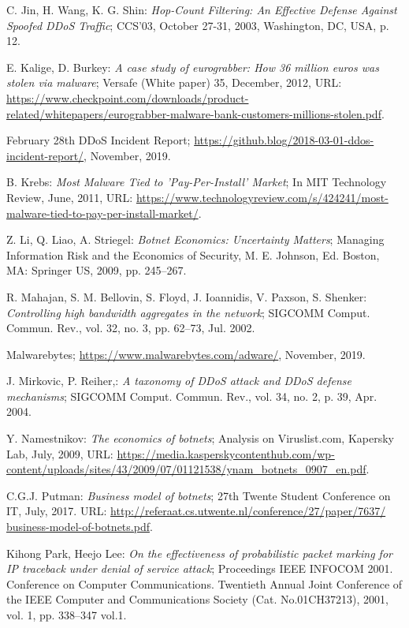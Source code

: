 \begin{thebibliography}{99}
 C. Jin, H. Wang, K. G. Shin: \emph{Hop-Count Filtering: An Effective Defense Against Spoofed DDoS Traffic}; CCS'03, October 27-31, 2003, Washington, DC, USA, p. 12.

 E. Kalige, D. Burkey: \emph{A case study of eurograbber: How 36 million euros was stolen via malware}; Versafe (White paper) 35, December, 2012, URL: \url{https://www.checkpoint.com/downloads/product-related/whitepapers/eurograbber-malware-bank-customers-millions-stolen.pdf}.

 February 28th DDoS Incident Report; \url{https://github.blog/2018-03-01-ddos-incident-report/}, November, 2019.

 B. Krebs: \emph{Most Malware Tied to 'Pay-Per-Install' Market}; In MIT Technology Review, June, 2011, URL: \url{https://www.technologyreview.com/s/424241/most-malware-tied-to-pay-per-install-market/}.

 Z. Li, Q. Liao, A. Striegel:  \emph{Botnet Economics: Uncertainty Matters}; Managing Information Risk and the Economics of Security, M. E. Johnson, Ed. Boston, MA: Springer US, 2009, pp. 245--267.

 R. Mahajan, S. M. Bellovin, S. Floyd, J. Ioannidis, V. Paxson, S. Shenker: \emph{Controlling high bandwidth aggregates in the network}; SIGCOMM Comput. Commun. Rev., vol. 32, no. 3, pp. 62--73, Jul. 2002.

 Malwarebytes; \url{https://www.malwarebytes.com/adware/}, November, 2019.

 J. Mirkovic, P. Reiher,: \emph{A taxonomy of DDoS attack and DDoS defense mechanisms}; SIGCOMM Comput. Commun. Rev., vol. 34, no. 2, p. 39, Apr. 2004.

 Y. Namestnikov: \emph{The economics of botnets}; Analysis on Viruslist.com, Kapersky Lab, July, 2009, URL: \url{https://media.kasperskycontenthub.com/wp-content/uploads/sites/43/2009/07/01121538/ynam_botnets_0907_en.pdf}.

 C.G.J. Putman: \emph{Business model of botnets}; 27th Twente Student Conference on IT, July, 2017. URL: \url{http://referaat.cs.utwente.nl/conference/27/paper/7637/ business-model-of-botnets.pdf}.

 Kihong Park, Heejo Lee: \emph{On the effectiveness of probabilistic packet marking for IP traceback under denial of service attack}; Proceedings IEEE INFOCOM 2001. Conference on Computer Communications. Twentieth Annual Joint Conference of the IEEE Computer and Communications Society (Cat. No.01CH37213), 2001, vol. 1, pp. 338--347 vol.1.


\end{thebibliography}
